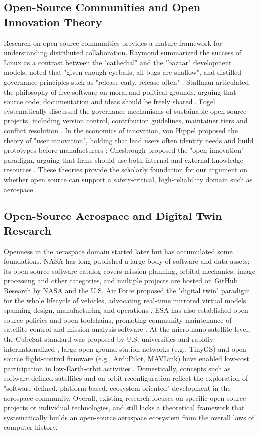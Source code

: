 \documentclass[11pt]{article}
\begin{document}
\subsection{Open-Source Communities and Open Innovation Theory}
Research on open-source communities provides a mature framework for understanding distributed collaboration. Raymond summarized the success of Linux as a contrast between the "cathedral" and the "bazaar" development models, noted that "given enough eyeballs, all bugs are shallow", and distilled governance principles such as "release early, release often" \cite{raymond1999}. Stallman articulated the philosophy of free software on moral and political grounds, arguing that source code, documentation and ideas should be freely shared \cite{stallman1985}. Fogel systematically discussed the governance mechanisms of sustainable open-source projects, including version control, contribution guidelines, maintainer tiers and conflict resolution \cite{fogel2005}. In the economics of innovation, von Hippel proposed the theory of "user innovation", holding that lead users often identify needs and build prototypes before manufacturers \cite{vonhippel2005}; Chesbrough proposed the "open innovation" paradigm, arguing that firms should use both internal and external knowledge resources \cite{chesbrough2003}. These theories provide the scholarly foundation for our argument on whether open source can support a safety-critical, high-reliability domain such as aerospace.

\subsection{Open-Source Aerospace and Digital Twin Research}
Openness in the aerospace domain started later but has accumulated some foundations. NASA has long published a large body of software and data assets; its open-source software catalog covers mission planning, orbital mechanics, image processing and other categories, and multiple projects are hosted on GitHub \cite{nasa}. Research by NASA and the U.S. Air Force proposed the "digital twin" paradigm for the whole lifecycle of vehicles, advocating real-time mirrored virtual models spanning design, manufacturing and operations \cite{glaessgen2012,grieves2017}. ESA has also established open-source policies and open toolchains, promoting community maintenance of satellite control and mission analysis software \cite{esa}. At the micro-nano-satellite level, the CubeSat standard was proposed by U.S. universities and rapidly internationalized \cite{puig2001}; large open ground-station networks (e.g., TinyGS) and open-source flight-control firmware (e.g., ArduPilot, MAVLink) have enabled low-cost participation in low-Earth-orbit activities \cite{tinygs,ardupilot,mavlink}. Domestically, concepts such as software-defined satellites and on-orbit reconfiguration \cite{xufanjiang2023} reflect the exploration of "software-defined, platform-based, ecosystem-oriented" development in the aerospace community. Overall, existing research focuses on specific open-source projects or individual technologies, and still lacks a theoretical framework that systematically builds an open-source aerospace ecosystem from the overall laws of computer history.
\end{document}
